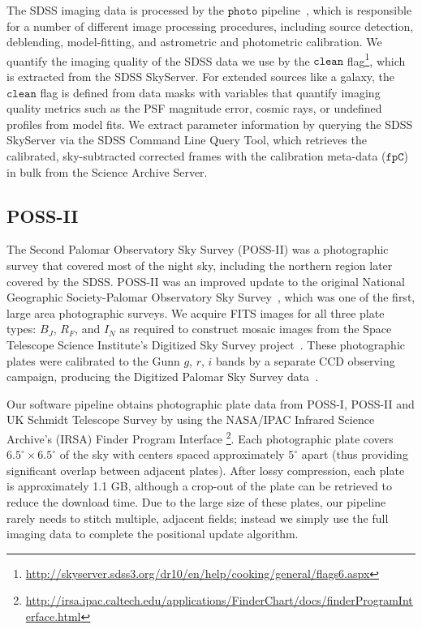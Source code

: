 \documentclass[authoryear, 12pt, 5p, times]{elsarticle}
\begin{document}
The SDSS imaging data is processed by the $\texttt{photo}$ pipeline~\citep{sdss-photo}, which is responsible for a number of different image processing procedures, including source detection, deblending, model-fitting, and astrometric and photometric calibration. We quantify the imaging quality of the SDSS data we use by the $\texttt{clean}$ flag\footnote{\url{http://skyserver.sdss3.org/dr10/en/help/cooking/general/flags6.aspx}}, which is extracted from the SDSS SkyServer. For extended sources like a galaxy, the $\texttt{clean}$ flag is defined from data masks with variables that quantify imaging quality metrics such as the PSF magnitude error, cosmic rays, or undefined profiles from model fits. We extract parameter information by querying the SDSS SkyServer via the SDSS Command Line Query Tool, which retrieves the calibrated, sky-subtracted corrected frames with the calibration meta-data ($\texttt{fpC}$) in bulk from the Science Archive Server.

\subsection{POSS-II}
The Second Palomar Observatory Sky Survey (POSS-II) was a photographic survey that covered most of the night sky, including the northern region later covered by the SDSS. POSS-II was an improved update to the original National Geographic Society-Palomar Observatory Sky Survey~\citep[NGS-POSS or POSS-I;][]{ngs-poss}, which was one of the first, large area photographic surveys. We acquire FITS images for all three plate types: $B_J$, $R_F$, and $I_N$ as required to construct mosaic images from the Space Telescope Science Institute's Digitized Sky Survey project~\citep[DSS;][]{dss}.  These photographic plates were calibrated to the  Gunn $g$, $r$, $i$ bands by a separate CCD observing campaign, producing the Digitized Palomar Sky Survey data~\citep[DPOSS;][]{dposs}. 

Our software pipeline obtains photographic plate data from POSS-I, POSS-II and UK Schmidt Telescope Survey by using the NASA/IPAC Infrared Science Archive's (IRSA) Finder Program Interface \footnote{\url{http://irsa.ipac.caltech.edu/applications/FinderChart/docs/finderProgramInterface.html}}. Each photographic plate covers $6.5^{\circ} \times 6.5^{\circ}$ of the sky with centers spaced approximately $5^{\circ}$ apart (thus providing significant overlap between adjacent plates). After lossy compression, each plate is approximately 1.1 GB, although a crop-out of the plate can be retrieved to reduce the download time. Due to the large size of these plates, our pipeline rarely needs to stitch multiple, adjacent fields; instead we simply use the full imaging data to complete the positional update algorithm.
\end{document}
